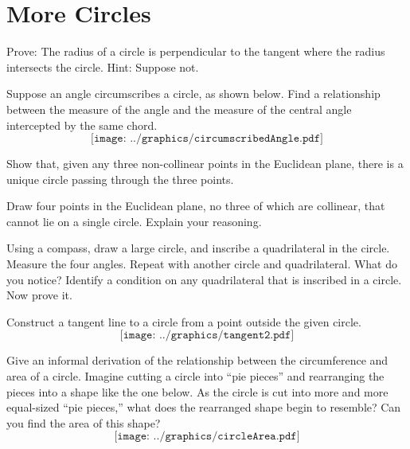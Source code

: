 \newpage

\section{More Circles}

\begin{prob}
Prove: The radius of a circle is perpendicular to the tangent where the radius intersects the circle.  Hint:  Suppose not. 
\end{prob}

\begin{prob}
Suppose an angle circumscribes a circle, as shown below.  Find a relationship between the measure of the angle and the measure of the central angle intercepted by the same chord.
$$\texttt{[image: ../graphics/circumscribedAngle.pdf]}$$
\end{prob}

\begin{prob}
Show that, given any three non-collinear points in the Euclidean
plane, there is a unique circle passing through the three points.
\end{prob}

\begin{prob}
Draw four points in the Euclidean plane, no three of which are collinear, that cannot lie on a single circle.  Explain your reasoning. 
\end{prob}

\begin{prob}
Using a compass, draw a large circle, and inscribe a quadrilateral in the circle.  Measure the four angles.  Repeat with another circle and quadrilateral.  What do you notice?  Identify a condition on any quadrilateral that is inscribed in a circle.  Now prove it.  
\end{prob}

\begin{prob}
Construct a tangent line to a circle from a point outside the given circle.
$$\texttt{[image: ../graphics/tangent2.pdf]}$$
\end{prob}

\begin{prob}
Give an informal derivation of the relationship between the circumference and area of a circle.  Imagine cutting a circle into ``pie pieces'' and rearranging the pieces into a shape like the one below.  As the circle is cut into more and more equal-sized ``pie pieces,'' what does the rearranged shape begin to resemble?  Can you find the area of this shape?  
$$\texttt{[image: ../graphics/circleArea.pdf]}$$
\end{prob}

